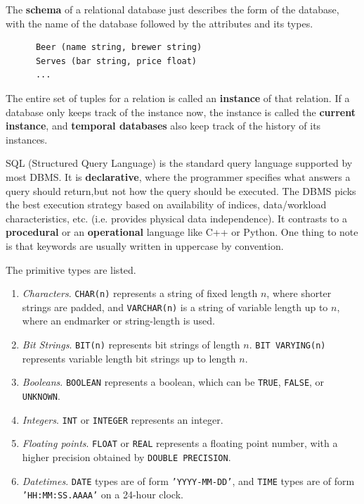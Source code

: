 \documentclass{article}
\begin{document}
  \begin{definition}[Schema]
    The \textbf{schema} of a relational database just describes the form of the database, with the name of the database followed by the attributes and its types. 
    \begin{lstlisting}
      Beer (name string, brewer string)
      Serves (bar string, price float)
      ...
    \end{lstlisting}
  \end{definition}

  \begin{definition}[Instance]
    The entire set of tuples for a relation is called an \textbf{instance} of that relation. If a database only keeps track of the instance now, the instance is called the \textbf{current instance}, and \textbf{temporal databases} also keep track of the history of its instances. 
  \end{definition}

  SQL (Structured Query Language) is the standard query language supported by most DBMS. It is \textbf{declarative}, where the programmer specifies what answers a query should return,but not how the query should be executed. The DBMS picks the best execution strategy based on availability of indices, data/workload characteristics, etc. (i.e. provides physical data independence). It contrasts to a \textbf{procedural} or an \textbf{operational} language like C++ or Python. One thing to note is that keywords are usually written in uppercase by convention. 

  \begin{definition}
    The primitive types are listed. 
    \begin{enumerate}
      \item \textit{Characters}. \texttt{CHAR(n)} represents a string of fixed length $n$, where shorter strings are padded, and \texttt{VARCHAR(n)} is a string of variable length up to $n$, where an endmarker or string-length is used. 
      \item \textit{Bit Strings}. \texttt{BIT(n)} represents bit strings of length $n$. \texttt{BIT VARYING(n)} represents variable length bit strings up to length $n$. 
      \item \textit{Booleans}. \texttt{BOOLEAN} represents a boolean, which can be \texttt{TRUE}, \texttt{FALSE}, or \texttt{UNKNOWN}. 
      \item \textit{Integers}. \texttt{INT} or \texttt{INTEGER} represents an integer. 
      \item \textit{Floating points}. \texttt{FLOAT} or \texttt{REAL} represents a floating point number, with a higher precision obtained by \texttt{DOUBLE PRECISION}. 
      \item \textit{Datetimes}. \texttt{DATE} types are of form \texttt{'YYYY-MM-DD'}, and \texttt{TIME} types are of form \texttt{'HH:MM:SS.AAAA'} on a 24-hour clock. 
    \end{enumerate}
  \end{definition}
\end{document}
